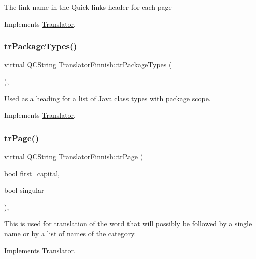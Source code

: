 The link name in the Quick links header for each page 

Implements \mbox{\hyperlink{class_translator}{Translator}}.

\mbox{\label{class_translator_finnish_ade0bbb00a326970f596d316691c5ef07}} 
\subsubsection{\texorpdfstring{trPackageTypes()}{trPackageTypes()}}
{\footnotesize\ttfamily virtual \mbox{\hyperlink{class_q_c_string}{Q\+C\+String}} Translator\+Finnish\+::tr\+Package\+Types (\begin{DoxyParamCaption}{ }\end{DoxyParamCaption})\hspace{0.3cm}{\ttfamily [inline]}, {\ttfamily [virtual]}}

Used as a heading for a list of Java class types with package scope. 

Implements \mbox{\hyperlink{class_translator}{Translator}}.

\mbox{\label{class_translator_finnish_a6b5dd6eda25bd0e2dd5e4019454fd612}} 
\subsubsection{\texorpdfstring{trPage()}{trPage()}}
{\footnotesize\ttfamily virtual \mbox{\hyperlink{class_q_c_string}{Q\+C\+String}} Translator\+Finnish\+::tr\+Page (\begin{DoxyParamCaption}\item[{bool}]{first\+\_\+capital,  }\item[{bool}]{singular }\end{DoxyParamCaption})\hspace{0.3cm}{\ttfamily [inline]}, {\ttfamily [virtual]}}

This is used for translation of the word that will possibly be followed by a single name or by a list of names of the category. 

Implements \mbox{\hyperlink{class_translator}{Translator}}.

